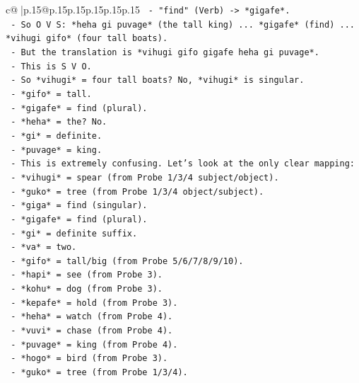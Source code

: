 \documentclass{article}
\begin{document}
{\begin{supertabular}{c@{$\;$}|p{.15\linewidth}@{}p{.15\linewidth}p{.15\linewidth}p{.15\linewidth}p{.15\linewidth}p{.15\linewidth}}
{{{\texttt{            {-} "find" (Verb) {-}> *gigafe*.} \\
\texttt{            {-} So O V S: *heha gi puvage* (the tall king) ... *gigafe* (find) ... *vihugi gifo* (four tall boats).} \\
\texttt{            {-} But the translation is *vihugi gifo gigafe heha gi puvage*.} \\
\texttt{            {-} This is S V O.} \\
\texttt{            {-} So *vihugi* = four tall boats? No, *vihugi* is singular.} \\
\texttt{            {-} *gifo* = tall.} \\
\texttt{            {-} *gigafe* = find (plural).} \\
\texttt{            {-} *heha* = the? No.} \\
\texttt{            {-} *gi* = definite.} \\
\texttt{            {-} *puvage* = king.} \\
\texttt{            {-} This is extremely confusing. Let's look at the only clear mapping:} \\
\texttt{              {-} *vihugi* = spear (from Probe 1/3/4 subject/object).} \\
\texttt{              {-} *guko* = tree (from Probe 1/3/4 object/subject).} \\
\texttt{              {-} *giga* = find (singular).} \\
\texttt{              {-} *gigafe* = find (plural).} \\
\texttt{              {-} *gi* = definite suffix.} \\
\texttt{              {-} *va* = two.} \\
\texttt{              {-} *gifo* = tall/big (from Probe 5/6/7/8/9/10).} \\
\texttt{              {-} *hapi* = see (from Probe 3).} \\
\texttt{              {-} *kohu* = dog (from Probe 3).} \\
\texttt{              {-} *kepafe* = hold (from Probe 3).} \\
\texttt{              {-} *heha* = watch (from Probe 4).} \\
\texttt{              {-} *vuvi* = chase (from Probe 4).} \\
\texttt{              {-} *puvage* = king (from Probe 4).} \\
\texttt{              {-} *hogo* = bird (from Probe 3).} \\
\texttt{              {-} *guko* = tree (from Probe 1/3/4).} \\
}}}
\end{supertabular}}
\end{document}
